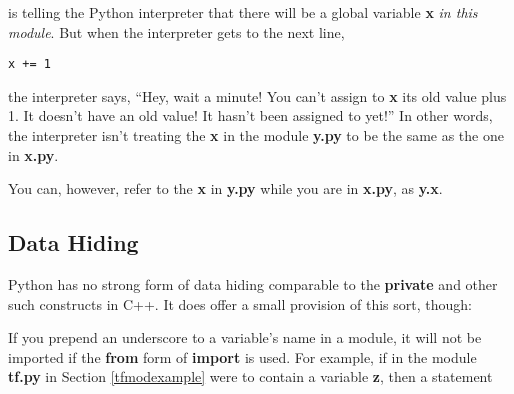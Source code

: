 is telling the Python interpreter that there will be a global variable
{\bf x} {\it in this module}.  But when the interpreter gets to the next
line,

\begin{Verbatim}[fontsize=\relsize{-2}]
   x += 1
\end{Verbatim}

the interpreter says, ``Hey, wait a minute!  You can't assign to {\bf x}
its old value plus 1.  It doesn't have an old value!  It hasn't been
assigned to yet!''  In other words, the interpreter isn't treating the
{\bf x} in the module {\bf y.py} to be the same as the one in {\bf
x.py}.

You can, however, refer to the {\bf x} in {\bf y.py} while you are in
{\bf x.py}, as {\bf y.x}.

% 

\subsection{Data Hiding}

Python has no strong form of data hiding comparable to the {\bf private}
and other such constructs in C++.  It does offer a small provision of
this sort, though:

If you prepend an underscore to a variable's name in a module, it will
not be imported if the {\bf from} form of {\bf import} is used.  For
example, if in the module {\bf tf.py} in Section \ref{tfmodexample} were
to contain a variable {\bf z}, then a statement

